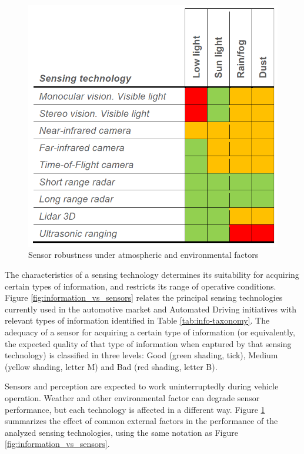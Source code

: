 \begin{figure}[b]
    \centering
    \includegraphics[width=0.68\linewidth]{"img/sensors_atmospheric_conditions_"} 
    \caption{Sensor robustness under atmospheric and environmental factors}
    \label{fig:sensors-environ}
\end{figure}

The characteristics of a sensing technology determines its 
suitability for acquiring certain types of information, and restricts its range 
of operative conditions.
Figure \ref{fig:information_vs_sensors} relates the principal sensing 
technologies currently used in the automotive market and Automated Driving
initiatives with relevant types of information identified in Table 
\ref{tab:info-taxonomy}. The adequacy of a sensor for acquiring a certain type
of information (or equivalently, the expected quality of that type of
information when captured by that sensing technology) is classified in three
levels: Good (green shading, tick), Medium (yellow shading, letter M) and Bad
(red shading, letter B).

Sensors and perception are expected to work uninterruptedly during vehicle 
operation. Weather and other environmental factor can degrade sensor
performance, but each technology is affected in a different way. 
Figure \ref{fig:sensors-environ} summarizes the effect of common external
factors in the performance of the analyzed sensing technologies, using the
same notation as Figure \ref{fig:information_vs_sensors}.

%

